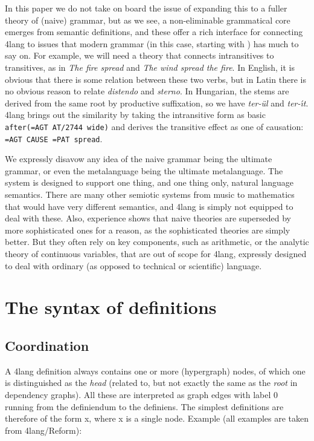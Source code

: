 \documentclass[11pt,bookmarks,bookmarksnumbered,naturalnames,plainpages=false,pdftex,colorlinks=true,urlcolor=blue,bookmarksdepth=subsection,plainpages=false]{paper}
\begin{document}
In this paper we do not take on board the issue of expanding this to a fuller
theory of (naive) grammar, but as we see, a non-eliminable grammatical
core emerges from semantic definitions, and these offer a rich interface for
connecting 4lang to issues that modern grammar (in this case, starting with
\cite{Fillmore:1968}) has much to say on. For example, we will need a theory
that connects intransitives to transitives, as in {\it The fire spread} and
{\it The wind spread the fire}. In English, it is obvious that there is some
relation between these two verbs, but in Latin there is no obvious reason to
relate {\it distendo} and {\it sterno}. In Hungarian, the stems are derived
from the same root by productive suffixation, so we have {\it ter-\"ul} and
{\it ter-\'{\i}t}. 4lang brings out the similarity by taking the intransitive
form as basic {\tt after(=AGT AT/2744 wide)} and derives the transitive effect
as one of causation: {\tt =AGT CAUSE {=PAT spread}}.

We expressly disavow any idea of the naive grammar being the ultimate grammar,
or even the metalanguage being the ultimate metalanguage. The system is
designed to support one thing, and one thing only, natural language
semantics. There are many other semiotic systems from music to mathematics
that would have very different semantics, and 4lang is simply not equipped to
deal with these. Also, experience shows that naive theories are superseded by
more sophisticated ones for a reason, as the sophisticated theories are simply
better. But they often rely on key components, such as arithmetic, or the
analytic theory of continuous variables, that are out of scope for 4lang,
expressly designed to deal with ordinary (as opposed to technical or
scientific) language.

\section{The syntax of definitions}\label{8thcol}

\subsection{Coordination}\label{comma}

A 4lang definition always contains one or more (hypergraph) nodes, of which
one is distinguished as the {\it head} (related to, but not exactly the same
as the {\it root} in dependency graphs). All these are interpreted as graph
edges with label 0 running from the definiendum to the definiens.  The simplest
definitions are therefore of the form x, where x is a single node. Example
(all examples are taken from 4lang/Reform):
\end{document}

